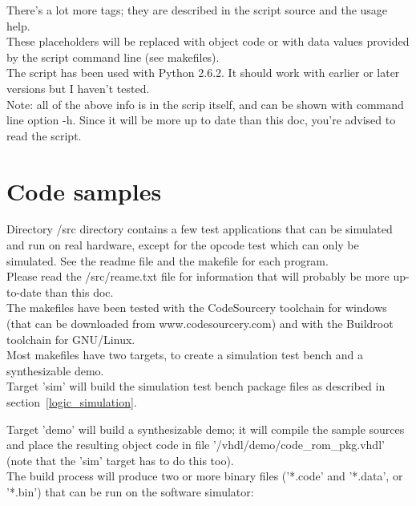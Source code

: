 \documentclass[11pt]{article}
\begin{document}
    There's a lot more tags; they are described in the script source and the 
    usage help.\\
    
    These placeholders will be replaced with object code or with data values
    provided by the script command line (see makefiles).\\

    The script has been used with Python 2.6.2. It should work with earlier
    or later versions but I haven't tested.\\

    Note: all of the above info is in the scrip itself, and can be shown
    with command line option -h. Since it will be more up to date than this 
    doc, you're advised to read the script.\\  
    

\section{Code samples}
\label{samples}

    Directory /src directory contains a few test applications that can be simulated
    and run on real hardware, except for the opcode test which can only be
    simulated. See the readme file and the makefile for each program.\\

    Please read the /src/reame.txt file for information that will probably be
    more up-to-date than this doc.\\
    
    The makefiles have been tested with the CodeSourcery toolchain for windows 
    (that can be downloaded from www.codesourcery.com) and with the Buildroot 
    toolchain for GNU/Linux.\\

    Most makefiles have two targets, to create a simulation test bench and a
    synthesizable demo.\\

    Target 'sim' will build the simulation test bench package files as described 
    in section~\ref{logic_simulation}.
    
    Target 'demo' will build a synthesizable demo; it will compile the sample
    sources and place the resulting object code in file 
    '/vhdl/demo/code\_rom\_pkg.vhdl' (note that the 'sim' target has to do this 
    too).\\
    
    The build process will produce two or more binary files ('*.code' and 
    '*.data', or '*.bin') that can be run on the software simulator:
\end{document}
